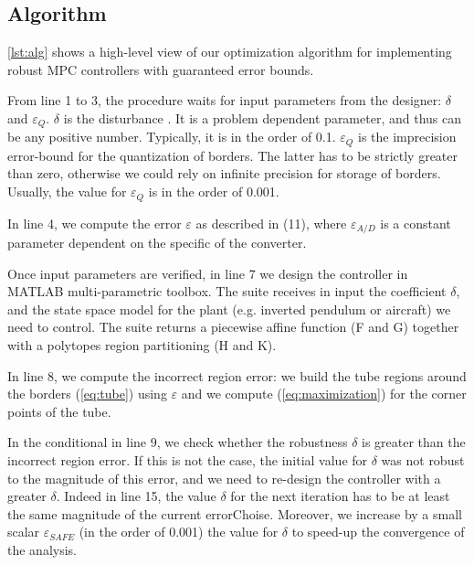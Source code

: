 \subsection{Algorithm}
\autoref{lst:alg} shows a high-level view of our optimization algorithm for
implementing robust MPC controllers with guaranteed error bounds.

From line 1 to 3, the procedure waits for input parameters from the designer: $\delta$ and $\varepsilon_{Q}$. $\delta$ is the disturbance . It is a problem dependent parameter, and thus can be any positive number. Typically, it is in the order of 0.1.
$\varepsilon_{Q}$ is the imprecision error-bound for the quantization of borders. 
The latter has to be strictly greater than zero, otherwise we could rely on infinite precision for storage of borders. Usually, the value for $\varepsilon_{Q}$ is in the order of 0.001.

In line 4, we compute the error $\varepsilon$ as described in (11), where $\varepsilon_{A/D}$ is a constant parameter dependent on the specific of the converter.

Once input parameters are verified, in line 7 we design the controller in MATLAB multi-parametric toolbox. The suite receives in input the coefficient $\delta$, and the state space model for the plant (e.g. inverted pendulum or aircraft) we need to control. The suite returns a piecewise affine function (F and G) together with a polytopes region partitioning (H and K).

In line 8, we compute the incorrect region error: we build the tube regions around the borders (\ref{eq:tube})  using $\varepsilon$ and we compute (\ref{eq:maximization}) for the corner points of the tube.

In the conditional in line 9, we check whether the robustness $\delta$ is greater than the incorrect region error. If this is not the case, the initial value for $\delta$ was not robust to the magnitude of this error, and we need to re-design the controller with a greater $\delta$. 
Indeed in line 15, the value $\delta$ for the next iteration has to be at least the same magnitude of the current errorChoise. Moreover, we increase by a small scalar $\varepsilon_{SAFE}$ (in the order of 0.001) the value for $\delta$ to speed-up the convergence of the analysis. 

